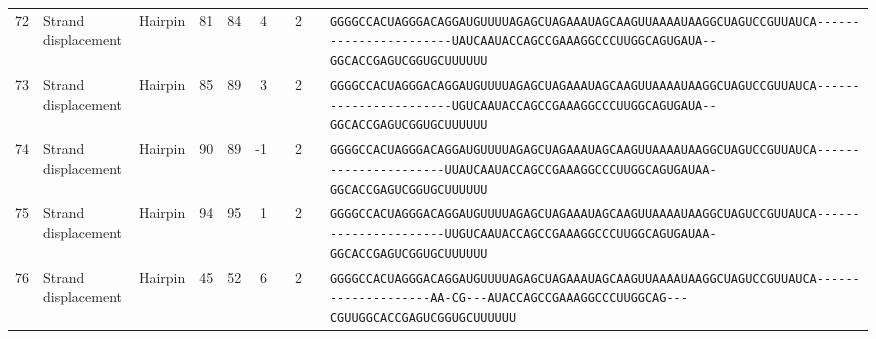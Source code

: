 \begin{tabular}{rllrrrrrcl}
 72 & Strand displacement & Hairpin & 81 & 84 & 4 &   & 2 &  &
 \color{ucsfdarkgrey}\verb|GGGGCCACUAGGGACAGGAU|\color{ucsforange}\verb|GUUUUA|\color{ucsfblue}\verb|GAGCUAGAAAUAGCAAGU|\color{ucsforange}\verb|UAAAAUAA|\color{ucsfnavy}\verb|GGCUAGUCCGU|\color{ucsforange}\verb|UAUCA|\color{ucsfteal}\verb|-----------------------UAUCA|\color{ucsfpurple}\verb|AUACCAGCCGAAAGGCCCUUGGCAG|\color{ucsfteal}\verb|UGAUA--|\color{ucsforange}\verb|GGCACCGAGUCGGUGCUUUUUU| \\

 73 & Strand displacement & Hairpin & 85 & 89 & 3 &   & 2 &  &
 \color{ucsfdarkgrey}\verb|GGGGCCACUAGGGACAGGAU|\color{ucsforange}\verb|GUUUUA|\color{ucsfblue}\verb|GAGCUAGAAAUAGCAAGU|\color{ucsforange}\verb|UAAAAUAA|\color{ucsfnavy}\verb|GGCUAGUCCGU|\color{ucsforange}\verb|UAUCA|\color{ucsfteal}\verb|-----------------------UGUCA|\color{ucsfpurple}\verb|AUACCAGCCGAAAGGCCCUUGGCAG|\color{ucsfteal}\verb|UGAUA--|\color{ucsforange}\verb|GGCACCGAGUCGGUGCUUUUUU| \\

 74 & Strand displacement & Hairpin & 90 & 89 & -1 &   & 2 &  &
 \color{ucsfdarkgrey}\verb|GGGGCCACUAGGGACAGGAU|\color{ucsforange}\verb|GUUUUA|\color{ucsfblue}\verb|GAGCUAGAAAUAGCAAGU|\color{ucsforange}\verb|UAAAAUAA|\color{ucsfnavy}\verb|GGCUAGUCCGU|\color{ucsforange}\verb|UAUCA|\color{ucsfteal}\verb|----------------------UUAUCA|\color{ucsfpurple}\verb|AUACCAGCCGAAAGGCCCUUGGCAG|\color{ucsfteal}\verb|UGAUAA-|\color{ucsforange}\verb|GGCACCGAGUCGGUGCUUUUUU| \\

 75 & Strand displacement & Hairpin & 94 & 95 & 1 &   & 2 &  &
 \color{ucsfdarkgrey}\verb|GGGGCCACUAGGGACAGGAU|\color{ucsforange}\verb|GUUUUA|\color{ucsfblue}\verb|GAGCUAGAAAUAGCAAGU|\color{ucsforange}\verb|UAAAAUAA|\color{ucsfnavy}\verb|GGCUAGUCCGU|\color{ucsforange}\verb|UAUCA|\color{ucsfteal}\verb|----------------------UUGUCA|\color{ucsfpurple}\verb|AUACCAGCCGAAAGGCCCUUGGCAG|\color{ucsfteal}\verb|UGAUAA-|\color{ucsforange}\verb|GGCACCGAGUCGGUGCUUUUUU| \\

 76 & Strand displacement & Hairpin & 45 & 52 & 6 &   & 2 &  &
 \color{ucsfdarkgrey}\verb|GGGGCCACUAGGGACAGGAU|\color{ucsforange}\verb|GUUUUA|\color{ucsfblue}\verb|GAGCUAGAAAUAGCAAGU|\color{ucsforange}\verb|UAAAAUAA|\color{ucsfnavy}\verb|GGCUAGUCCGU|\color{ucsforange}\verb|UAUCA|\color{ucsfteal}\verb|--------------------AA-CG---|\color{ucsfpurple}\verb|AUACCAGCCGAAAGGCCCUUGGCAG|\color{ucsfteal}\verb|---CGUU|\color{ucsforange}\verb|GGCACCGAGUCGGUGCUUUUUU| \\


\end{tabular}
